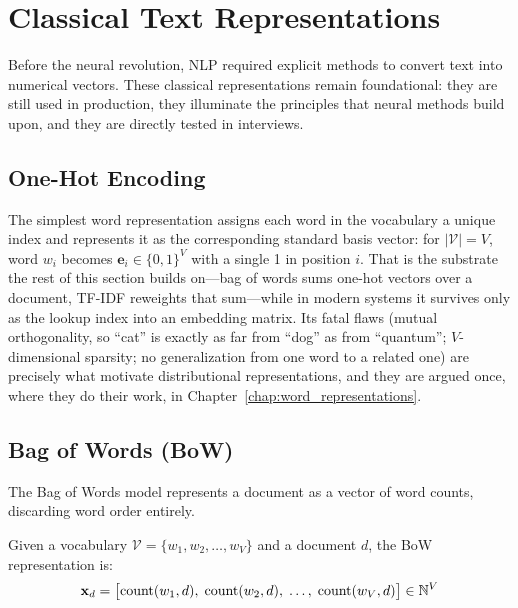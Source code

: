 \section{Classical Text Representations}
\label{sec:representations}

Before the neural revolution, NLP required explicit methods to convert text into numerical
vectors. These classical representations remain foundational: they are still used in
production, they illuminate the principles that neural methods build upon, and they are
directly tested in interviews.

\subsection{One-Hot Encoding}
\label{sec:one_hot}

The simplest word representation assigns each word in the vocabulary a unique index and
represents it as the corresponding standard basis vector: for $|\mathcal{V}| = V$, word
$w_i$ becomes $\mathbf{e}_i \in \{0, 1\}^V$ with a single 1 in position $i$. That is the
substrate the rest of this section builds on---bag of words sums one-hot vectors over a
document, TF-IDF reweights that sum---while in modern systems it survives only as the
lookup index into an embedding matrix. Its fatal flaws (mutual orthogonality, so ``cat''
is exactly as far from ``dog'' as from ``quantum''; $V$-dimensional sparsity; no
generalization from one word to a related one) are precisely what motivate distributional
representations, and they are argued once, where they do their work, in
Chapter~\ref{chap:word_representations}.

\subsection{Bag of Words (BoW)}
\label{sec:bow}

The Bag of Words model represents a document as a vector of word counts, discarding word
order entirely.

Given a vocabulary $\mathcal{V} = \{w_1, w_2, \ldots, w_V\}$ and a document $d$, the BoW
representation is:
\begin{equation}
    \mathbf{x}_d = \bigl[\text{count}(w_1, d), \; \text{count}(w_2, d), \; \ldots, \; \text{count}(w_V, d)\bigr] \in \mathbb{N}^V
\end{equation}

